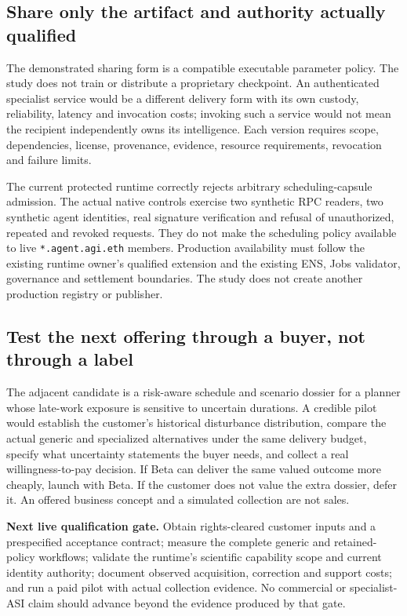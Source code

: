 \documentclass[11pt,letterpaper]{article}
\begin{document}
\subsection{Share only the artifact and authority actually qualified}

The demonstrated sharing form is a compatible executable parameter policy. The study does not train or distribute a proprietary checkpoint. An authenticated specialist service would be a different delivery form with its own custody, reliability, latency and invocation costs; invoking such a service would not mean the recipient independently owns its intelligence. Each version requires scope, dependencies, license, provenance, evidence, resource requirements, revocation and failure limits.

The current protected runtime correctly rejects arbitrary scheduling-capsule admission. The actual native controls exercise two synthetic RPC readers, two synthetic agent identities, real signature verification and refusal of unauthorized, repeated and revoked requests. They do not make the scheduling policy available to live \texttt{*.agent.agi.eth} members. Production availability must follow the existing runtime owner's qualified extension and the existing ENS, Jobs validator, governance and settlement boundaries. The study does not create another production registry or publisher.

\subsection{Test the next offering through a buyer, not through a label}

The adjacent candidate is a risk-aware schedule and scenario dossier for a planner whose late-work exposure is sensitive to uncertain durations. A credible pilot would establish the customer's historical disturbance distribution, compare the actual generic and specialized alternatives under the same delivery budget, specify what uncertainty statements the buyer needs, and collect a real willingness-to-pay decision. If Beta can deliver the same valued outcome more cheaply, launch with Beta. If the customer does not value the extra dossier, defer it. An offered business concept and a simulated collection are not sales.

\begin{findingbox}
\textbf{Next live qualification gate.} Obtain rights-cleared customer inputs and a prespecified acceptance contract; measure the complete generic and retained-policy workflows; validate the runtime's scientific capability scope and current identity authority; document observed acquisition, correction and support costs; and run a paid pilot with actual collection evidence. No commercial or specialist-ASI claim should advance beyond the evidence produced by that gate.
\end{findingbox}
\end{document}
